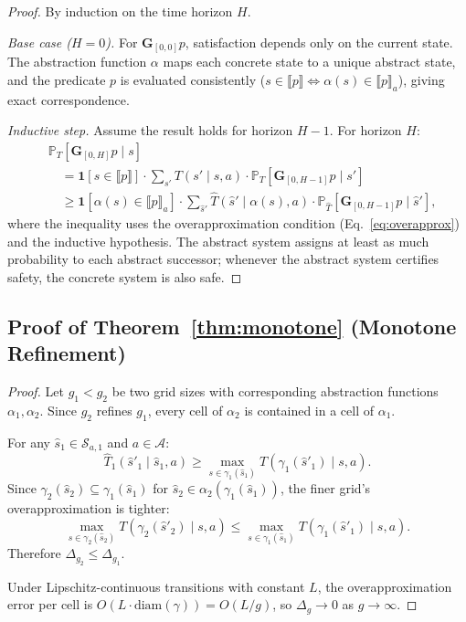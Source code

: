 \documentclass[11pt]{article}
\newcommand{\Prob}{\mathbb{P}}
\newcommand{\cA}{\mathcal{A}}
\newcommand{\cS}{\mathcal{S}}
\begin{document}
\begin{proof}
By induction on the time horizon $H$.

\emph{Base case ($H = 0$).}
For $\mathbf{G}_{[0,0]} p$, satisfaction depends only on the current
state.  The abstraction function $\alpha$ maps each concrete state to
a unique abstract state, and the predicate $p$ is evaluated
consistently ($s \in \llbracket p \rrbracket \Leftrightarrow
\alpha(s) \in \llbracket p \rrbracket_a$), giving exact
correspondence.

\emph{Inductive step.}
Assume the result holds for horizon $H{-}1$.  For horizon $H$:
\begin{align}
  &\Prob_T[\mathbf{G}_{[0,H]} p \mid s] \\
  &\quad= \mathbf{1}[s \in \llbracket p \rrbracket] \cdot
     \sum_{s'} T(s' \mid s, a) \cdot
     \Prob_T[\mathbf{G}_{[0,H-1]} p \mid s'] \\
  &\quad\geq \mathbf{1}[\alpha(s) \in \llbracket p \rrbracket_a]
     \cdot \sum_{\hat{s}'} \hat{T}(\hat{s}' \mid \alpha(s), a)
     \cdot \Prob_{\hat{T}}[\mathbf{G}_{[0,H-1]} p \mid \hat{s}'],
\end{align}
where the inequality uses the overapproximation condition
(Eq.~\ref{eq:overapprox}) and the inductive hypothesis.  The abstract
system assigns at least as much probability to each abstract
successor; whenever the abstract system certifies safety, the concrete
system is also safe.
\end{proof}

\subsection{Proof of Theorem~\ref{thm:monotone}
  (Monotone Refinement)}

\begin{proof}
Let $g_1 < g_2$ be two grid sizes with corresponding abstraction
functions $\alpha_1, \alpha_2$.  Since $g_2$ refines $g_1$, every
cell of $\alpha_2$ is contained in a cell of $\alpha_1$.

For any $\hat{s}_1 \in \cS_{a,1}$ and $a \in \cA$:
\begin{equation}
  \hat{T}_1(\hat{s}'_1 \mid \hat{s}_1, a) \geq
  \max_{s \in \gamma_1(\hat{s}_1)} T(\gamma_1(\hat{s}'_1) \mid s, a).
\end{equation}
Since $\gamma_2(\hat{s}_2) \subseteq \gamma_1(\hat{s}_1)$ for
$\hat{s}_2 \in \alpha_2(\gamma_1(\hat{s}_1))$, the finer grid's
overapproximation is tighter:
\begin{equation}
  \max_{s \in \gamma_2(\hat{s}_2)} T(\gamma_2(\hat{s}'_2) \mid s, a)
  \leq \max_{s \in \gamma_1(\hat{s}_1)} T(\gamma_1(\hat{s}'_1)
  \mid s, a).
\end{equation}
Therefore $\Delta_{g_2} \leq \Delta_{g_1}$.

Under Lipschitz-continuous transitions with constant $L$, the
overapproximation error per cell is $O(L \cdot \mathrm{diam}(\gamma))
= O(L/g)$, so $\Delta_g \to 0$ as $g \to \infty$.
\end{proof}
\end{document}
